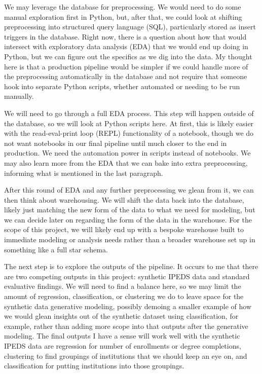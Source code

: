 \documentclass[sigconf, authorversion, nonacm]{acmart}
\begin{document}
    We may leverage the database for preprocessing. We would need to do some manual exploration first in Python, but, after that, we could look at shifting preprocessing into structured query language (SQL), particularly stored as insert triggers in the database. Right now, there is a question about how that would intersect with exploratory data analysis (EDA) that we would end up doing in Python, but we can figure out the specifics as we dig into the data. My thought here is that a production pipeline would be simpler if we could handle more of the preprocessing automatically in the database and not require that someone hook into separate Python scripts, whether automated or needing to be run manually.

    We will need to go through a full EDA process. This step will happen outside of the database, so we will look at Python scripts here. At first, this is likely easier with the read-eval-print loop (REPL) functionality of a notebook, though we do not want notebooks in our final pipeline until much closer to the end in production. We need the automation power in scripts instead of notebooks. We may also learn more from the EDA that we can bake into extra preprocessing, informing what is mentioned in the last paragraph.

    After this round of EDA and any further preprocessing we glean from it, we can then think about warehousing. We will shift the data back into the database, likely just matching the new form of the data to what we need for modeling, but we can decide later on regarding the form of the data in the warehouse. For the scope of this project, we will likely end up with a bespoke warehouse built to immediate modeling or analysis needs rather than a broader warehouse set up in something like a full star schema.

    The next step is to explore the outputs of the pipeline. It occurs to me that there are two competing outputs in this project: synthetic IPEDS data and standard evaluative findings. We will need to find a balance here, so we may limit the amount of regression, classification, or clustering we do to leave space for the synthetic data generative modeling, possibly demoing a smaller example of how we would glean insights out of the synthetic dataset using classification, for example, rather than adding more scope into that outputs after the generative modeling. The final outputs I have a sense will work well with the synthetic IPEDS data are regression for number of enrollments or degree completions, clustering to find groupings of institutions that we should keep an eye on, and classification for putting institutions into those groupings.
\end{document}
